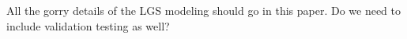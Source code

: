 All the gorry details of the LGS modeling should go in this paper. Do we need to include validation testing as well? 